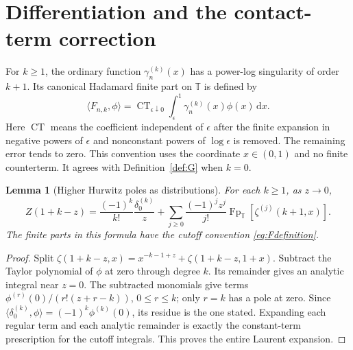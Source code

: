 \documentclass[11pt]{article}
\numberwithin{equation}{section}
\newtheorem{lemma}[theorem]{Lemma}
\theoremstyle{definition}
\theoremstyle{remark}
\DeclareMathOperator{\Fp}{Fp}
\DeclareMathOperator{\CT}{CT}
\newcommand{\T}{\mathbb T}
\newcommand{\dd}{\,\mathrm d}
\begin{document}
\section{Differentiation and the contact-term correction}
\label{sec:contact}
For $k\ge1$, the ordinary function $\gamma_n^{(k)}(x)$ has a power-log
singularity of order $k+1$. Its canonical Hadamard finite part on $\T$
is defined by
\begin{equation}\label{eq:Fdefinition}
 \langle F_{n,k},\phi\rangle
 =\CT_{\epsilon\downarrow0}
       \int_\epsilon^1\gamma_n^{(k)}(x)\phi(x)\dd x.
\end{equation}
Here $\CT$ means the coefficient independent of $\epsilon$ after the
finite expansion in negative powers of $\epsilon$ and nonconstant powers
of $\log\epsilon$ is removed. The remaining error tends to zero.
This convention uses the coordinate $x\in(0,1)$ and no finite counterterm.
It agrees with Definition~\ref{def:G} when $k=0$.

\begin{lemma}[Higher Hurwitz poles as distributions]\label{lem:higherpoles}
For each $k\ge1$, as $z\to0$,
\begin{equation}\label{eq:higherpole}
 Z(1+k-z)=\frac{(-1)^k}{k!}\frac{\delta_0^{(k)}}z
 +\sum_{j\ge0}\frac{(-1)^jz^j}{j!}
           \Fp_{\T}[\zeta^{(j)}(k+1,x)].
\end{equation}
The finite parts in this formula have the cutoff convention
\eqref{eq:Fdefinition}.
\end{lemma}
\begin{proof}
Split $\zeta(1+k-z,x)=x^{-k-1+z}+\zeta(1+k-z,1+x)$.
Subtract the Taylor polynomial of $\phi$ at zero through degree $k$.
Its remainder gives an analytic integral near $z=0$. The subtracted
monomials give terms
$\phi^{(r)}(0)/(r!(z+r-k))$, $0\le r\le k$; only $r=k$ has a pole
at zero. Since $\langle\delta_0^{(k)},\phi\rangle=(-1)^k\phi^{(k)}(0)$,
its residue is the one stated. Expanding each regular term and each
analytic remainder is exactly the constant-term prescription for the
cutoff integrals. This proves the entire Laurent expansion.
\end{proof}
\end{document}
